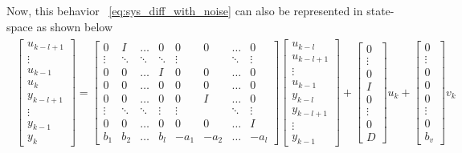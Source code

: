 Now, this behavior ~\eqref{eq:sys_diff_with_noise} can also be represented in state-space as shown below
%
\begin{align}
\begin{split}
\label{eq:extended_sys_bw}
\begin{bmatrix} u_{k-l+1} \\ \vdots \\ u_{k-1} \\ u_{k} \\ y_{k-l+1} \\ \vdots \\ y_{k-1} \\ y_{k} \end{bmatrix} = \begin{bmatrix} 
0 & I & \dots & 0 & 0 & 0 & \dots & 0  \\
\vdots & \ddots & \ddots&\ddots& \vdots & & \ddots&\vdots \\
0 & 0 & \dots & I & 0& 0&  \dots & 0 \\
0 & 0 & \dots & 0 & 0 & 0&  \dots & 0 \\
0 & 0 & \dots & 0 & 0& I& \dots &0 \\
\vdots & \ddots & \ddots&\vdots&\vdots & & \ddots&\vdots \\
0 & 0 & \dots & 0 & 0& 0&  \dots & I \\
b_1 & b_2 & \dots & b_l & -a_1 & -a_2 & \dots &  -a_l 
\end{bmatrix}  
\begin{bmatrix} u_{k-l} \\ u_{k-l+1} \\ \vdots \\ u_{k-1} \\ y_{k-l} \\ y_{k-l+1} \\ \vdots \\ y_{k-1}  \end{bmatrix} + 
\begin{bmatrix} 
0 \\ \vdots \\ 0 \\ I \\ 0 \\ \vdots \\ 0 \\ D  \end{bmatrix} 
u_{k} + \begin{bmatrix} 0 \\ \vdots \\ 0 \\ 0 \\ 0 \\ \vdots \\ 0 \\  b_v \end{bmatrix} v_{k} 
\end{split} 
\end{align}
